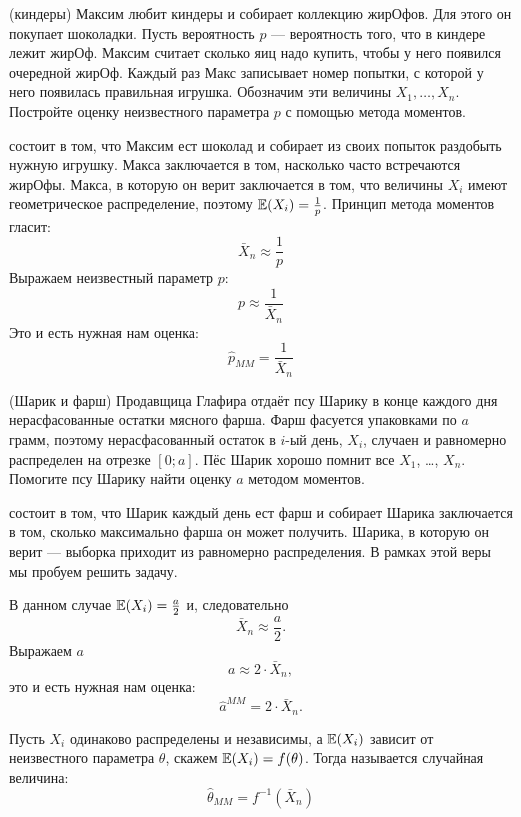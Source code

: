 \documentclass[12pt, a4paper, oneside]{article}
\begin{document}
\begin{problem}{(киндеры)}
Максим любит киндеры и собирает коллекцию жирОфов. Для этого он покупает шоколадки. Пусть вероятность $p$ --- вероятность того, что в киндере лежит жирОф. Максим считает сколько яиц надо купить, чтобы у него появился очередной жирОф. Каждый раз Макс записывает номер попытки, с которой у него появилась правильная игрушка. Обозначим эти величины $X_{1}, \ldots, X_{n} $. Постройте оценку неизвестного параметра $ p $ с помощью метода моментов.
\end{problem}

\begin{sol}
 состоит в том, что Максим ест шоколад и собирает  из своих попыток раздобыть нужную игрушку.  Макса заключается в том, насколько часто встречаются жирОфы.  Макса, в которую он верит заключается в том, что величины $ X_{i} $ имеют геометрическое распределение, поэтому $ \mathbb{E}(X_{i})=\frac{1}{p} $. Принцип метода моментов гласит:
	\[ \bar{X}_{n}\approx \frac{1}{p}\]
	Выражаем неизвестный параметр $ p $:
	\[ p\approx \frac{1}{\bar{X}_{n}} \]
	Это и есть нужная нам оценка:
	\[ \hat{p}_{MM} = \frac{1}{\bar{X}_{n}} \]
\end{sol}


\begin{problem}{(Шарик и фарш)}
Продавщица Глафира отдаёт псу Шарику в конце каждого дня нерасфасованные остатки мясного фарша. Фарш фасуется упаковками по $a$ грамм, поэтому нерасфасованный остаток в $i$-ый день, $X_i$, случаен и равномерно распределен на отрезке $[0;a]$. Пёс Шарик хорошо помнит все $X_1$, \ldots, $X_n$. Помогите псу Шарику найти оценку $a$ методом моментов.
\end{problem}

\begin{sol}
 состоит в том, что Шарик каждый день ест фарш и собирает   Шарика заключается в том, сколько максимально фарша он может получить.  Шарика, в которую он верит --- выборка приходит из равномерно распределения. В рамках этой веры мы пробуем решить задачу.

В данном случае $ \mathbb{E}(X_{i})=\frac{a}{2} $ и, следовательно
\[ \bar{X}_{n}\approx \frac{a}{2}. \]
Выражаем $a$
\[ a \approx 2 \cdot \bar{X}_{n}, \]
это и есть нужная нам оценка:
\[ \hat{a}^{MM}= 2 \cdot \bar{X}_{n}. \]
\end{sol}

\begin{definition} 
Пусть $ X_{i} $ одинаково распределены и независимы, а $ \mathbb{E}(X_{i}) $ зависит от неизвестного параметра $ \theta $, скажем $ \mathbb{E}(X_{i}) = f(\theta) $. Тогда  называется случайная величина:
\[ \hat{\theta}_{MM} = f^{-1}(\bar{X}_{n}) \]
\end{definition} 
\end{document}
